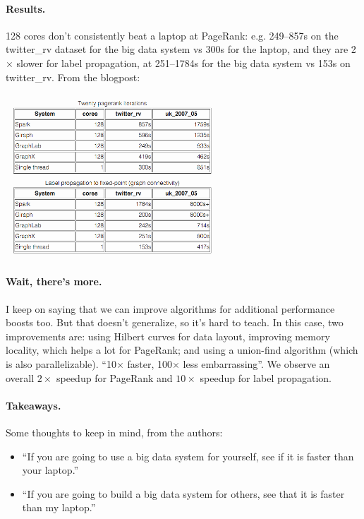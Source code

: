\documentclass[a4paper]{report}
\begin{document}
\paragraph{Results.} 128 cores don't consistently beat a laptop at PageRank: e.g. 249--857s on the twitter\_rv dataset for the big data system vs 300s for the laptop, and they are 2$\times$ slower for label
propagation, at 251--1784s for the big data system vs 153s on
twitter\_rv. From the blogpost:

\begin{center}
	\includegraphics[width=0.60\textwidth]{images/pagerank.png}
\end{center}

\paragraph{Wait, there's more.} I keep on saying that we can improve algorithms for additional performance boosts too.
But that doesn't generalize, so it's hard to teach. In this case, two improvements are: using Hilbert curves
for data layout, improving memory locality, which helps a lot for PageRank; and using a union-find algorithm 
(which is also parallelizable). ``10$\times$ faster, 100$\times$ less embarrassing''.  We observe an overall
$2\times$ speedup for PageRank and $10\times$ speedup for label propagation.

\paragraph{Takeaways.} Some thoughts to keep in mind, from the authors:
\begin{itemize}
\item    ``If you are going to use a big data system for yourself, see if it is faster than your laptop.''
\item    ``If you are going to build a big data system for others, see that it is faster than my laptop.''
\end{itemize}
\end{document}
